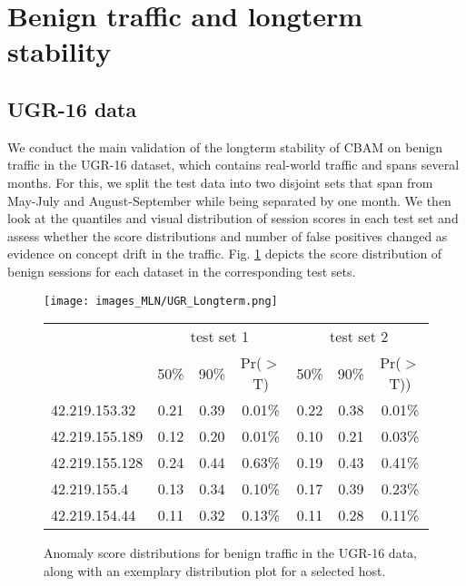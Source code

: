\section{Benign traffic and longterm stability}\label{sec:Benigntraffic}

\subsection{UGR-16 data}\label{sec:UGR_benign}


We conduct the main validation of the longterm stability of CBAM on benign traffic in the UGR-16 dataset, which contains real-world traffic and spans several months. For this, we split the test data into two disjoint sets that span from May-July and August-September while being separated by one month.
We then look at the quantiles and visual distribution of session scores in each test set and assess whether the score distributions and number of false positives changed as evidence on concept drift in the traffic.
Fig. \ref{fig:UGRrealresults} depicts the score distribution of benign sessions for each dataset in the corresponding test sets. 




\begin{figure}
    \begin{center}
\texttt{[image: images\_MLN/UGR\_Longterm.png]} 


\begin{tabular}{l|ccc|ccc}
  \hline
&\multicolumn{3}{c|}{test set 1}&\multicolumn{3}{c}{test set 2}\\
 &  50\%  &  90\%  &  Pr($>$T)  &  50\%  &  90\%  &  Pr($>$T)) \\ 
  \hline
42.219.153.32 & 0.21 & 0.39   & 0.01\% & 0.22 & 0.38   & 0.01\% \\ 
  42.219.155.189 & 0.12 & 0.20  & 0.01\% &0.10 & 0.21  & 0.03\% \\ 
  42.219.155.128 & 0.24 & 0.44   & 0.63\% & 0.19 & 0.43   & 0.41\% \\ 
  42.219.155.4 & 0.13 & 0.34 & 0.10\% & 0.17 & 0.39 & 0.23\% \\ 
  42.219.154.44 & 0.11 & 0.32 & 0.13\% & 0.11 & 0.28 & 0.11\% \\ 
   \hline
\end{tabular}


\end{center}
\caption{Anomaly score distributions for benign traffic in the UGR-16 data, along with an exemplary distribution plot for a selected host.}\label{fig:UGRrealresults}
\end{figure}

